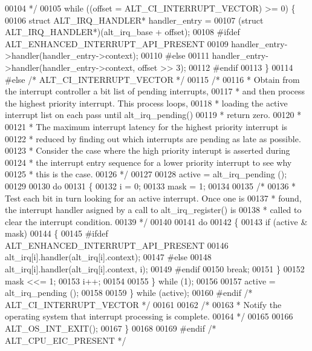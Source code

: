 \begin{DoxyCode}
00104 \textcolor{comment}{   */}
00105   \textcolor{keywordflow}{while} ((offset = ALT\_CI\_INTERRUPT\_VECTOR) >= 0) \{
00106     \textcolor{keyword}{struct }ALT_IRQ_HANDLER* handler\_entry = 
00107       (\textcolor{keyword}{struct }ALT_IRQ_HANDLER*)(alt\_irq\_base + offset);
00108 \textcolor{preprocessor}{#ifdef ALT\_ENHANCED\_INTERRUPT\_API\_PRESENT}
00109     handler\_entry->handler(handler\_entry->context);
00110 \textcolor{preprocessor}{#else}
00111     handler\_entry->handler(handler\_entry->context, offset >> 3);
00112 \textcolor{preprocessor}{#endif}
00113   \}
00114 \textcolor{preprocessor}{#else }\textcolor{comment}{/* ALT\_CI\_INTERRUPT\_VECTOR */}\textcolor{preprocessor}{}
00115   \textcolor{comment}{/* }
00116 \textcolor{comment}{   * Obtain from the interrupt controller a bit list of pending interrupts,}
00117 \textcolor{comment}{   * and then process the highest priority interrupt. This process loops, }
00118 \textcolor{comment}{   * loading the active interrupt list on each pass until alt\_irq\_pending() }
00119 \textcolor{comment}{   * return zero.}
00120 \textcolor{comment}{   * }
00121 \textcolor{comment}{   * The maximum interrupt latency for the highest priority interrupt is}
00122 \textcolor{comment}{   * reduced by finding out which interrupts are pending as late as possible.}
00123 \textcolor{comment}{   * Consider the case where the high priority interupt is asserted during}
00124 \textcolor{comment}{   * the interrupt entry sequence for a lower priority interrupt to see why}
00125 \textcolor{comment}{   * this is the case.}
00126 \textcolor{comment}{   */}
00127 
00128   active = alt_irq_pending ();
00129 
00130   \textcolor{keywordflow}{do}
00131   \{
00132     i = 0;
00133     mask = 1;
00134 
00135     \textcolor{comment}{/*}
00136 \textcolor{comment}{     * Test each bit in turn looking for an active interrupt. Once one is }
00137 \textcolor{comment}{     * found, the interrupt handler asigned by a call to alt\_irq\_register() is}
00138 \textcolor{comment}{     * called to clear the interrupt condition.}
00139 \textcolor{comment}{     */}
00140 
00141     \textcolor{keywordflow}{do}
00142     \{
00143       \textcolor{keywordflow}{if} (active & mask)
00144       \{ 
00145 \textcolor{preprocessor}{#ifdef ALT\_ENHANCED\_INTERRUPT\_API\_PRESENT}
00146         alt_irq[i].handler(alt_irq[i].context); 
00147 \textcolor{preprocessor}{#else}
00148         alt_irq[i].handler(alt_irq[i].context, i); 
00149 \textcolor{preprocessor}{#endif}
00150         \textcolor{keywordflow}{break};
00151       \}
00152       mask <<= 1;
00153       i++;
00154 
00155     \} \textcolor{keywordflow}{while} (1);
00156 
00157     active = alt_irq_pending ();
00158     
00159   \} \textcolor{keywordflow}{while} (active);
00160 \textcolor{preprocessor}{#endif }\textcolor{comment}{/* ALT\_CI\_INTERRUPT\_VECTOR */}\textcolor{preprocessor}{}
00161 
00162   \textcolor{comment}{/*}
00163 \textcolor{comment}{   * Notify the operating system that interrupt processing is complete.}
00164 \textcolor{comment}{   */} 
00165 
00166   ALT_OS_INT_EXIT();
00167 \}
00168 
00169 \textcolor{preprocessor}{#endif }\textcolor{comment}{/* ALT\_CPU\_EIC\_PRESENT */}\textcolor{preprocessor}{}
\end{DoxyCode}

